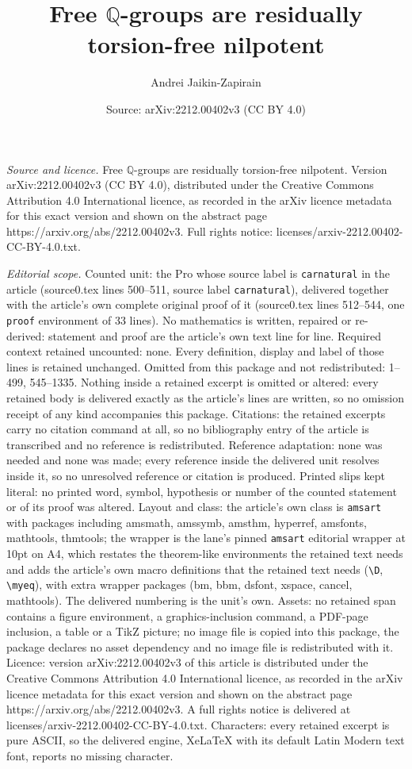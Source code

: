 \documentclass[10pt,a4paper]{amsart}
\title[Free $\mathbb Q$-groups are residually torsion-free nilpoten]{Free $\mathbb Q$-groups are residually torsion-free nilpotent}
\author{Andrei Jaikin-Zapirain}
\date{Source: arXiv:2212.00402v3 (CC BY 4.0)}
\begin{document}
\maketitle

\noindent\emph{Source and licence.} Free $\mathbb Q$-groups are residually torsion-free nilpotent. Version arXiv:2212.00402v3 (CC BY 4.0), distributed under the Creative Commons Attribution 4.0 International licence, as recorded in the arXiv licence metadata for this exact version and shown on the abstract page https://arxiv.org/abs/2212.00402v3. Full rights notice: licenses/arxiv-2212.00402-CC-BY-4.0.txt.\par\smallskip

\noindent\textit{Editorial scope.} Counted unit: the Pro whose source label is \texttt{carnatural} in the article (source0.tex lines 500--511, source label \texttt{carnatural}), delivered together with the article's own complete original proof of it (source0.tex lines 512--544, one \texttt{proof} environment of 33 lines). No mathematics is written, repaired or re-derived: statement and proof are the article's own text line for line. Required context retained uncounted: none. Every definition, display and label of those lines is retained unchanged. Omitted from this package and not redistributed: 1--499, 545--1335. Nothing inside a retained excerpt is omitted or altered: every retained body is delivered exactly as the article's lines are written, so no omission receipt of any kind accompanies this package. Citations: the retained excerpts carry no citation command at all, so no bibliography entry of the article is transcribed and no reference is redistributed. Reference adaptation: none was needed and none was made; every reference inside the delivered unit resolves inside it, so no unresolved reference or citation is produced. Printed slips kept literal: no printed word, symbol, hypothesis or number of the counted statement or of its proof was altered. Layout and class: the article's own class is \texttt{amsart} with packages including amsmath, amssymb, amsthm, hyperref, amsfonts, mathtools, thmtools; the wrapper is the lane's pinned \texttt{amsart} editorial wrapper at 10pt on A4, which restates the theorem-like environments the retained text needs and adds the article's own macro definitions that the retained text needs (\texttt{\textbackslash D}, \texttt{\textbackslash myeq}), with extra wrapper packages (bm, bbm, dsfont, xspace, cancel, mathtools). The delivered numbering is the unit's own. Assets: no retained span contains a figure environment, a graphics-inclusion command, a PDF-page inclusion, a table or a TikZ picture; no image file is copied into this package, the package declares no asset dependency and no image file is redistributed with it. Licence: version arXiv:2212.00402v3 of this article is distributed under the Creative Commons Attribution 4.0 International licence, as recorded in the arXiv licence metadata for this exact version and shown on the abstract page https://arxiv.org/abs/2212.00402v3. A full rights notice is delivered at licenses/arxiv-2212.00402-CC-BY-4.0.txt. Characters: every retained excerpt is pure ASCII, so the delivered engine, XeLaTeX with its default Latin Modern text font, reports no missing character.
\end{document}
